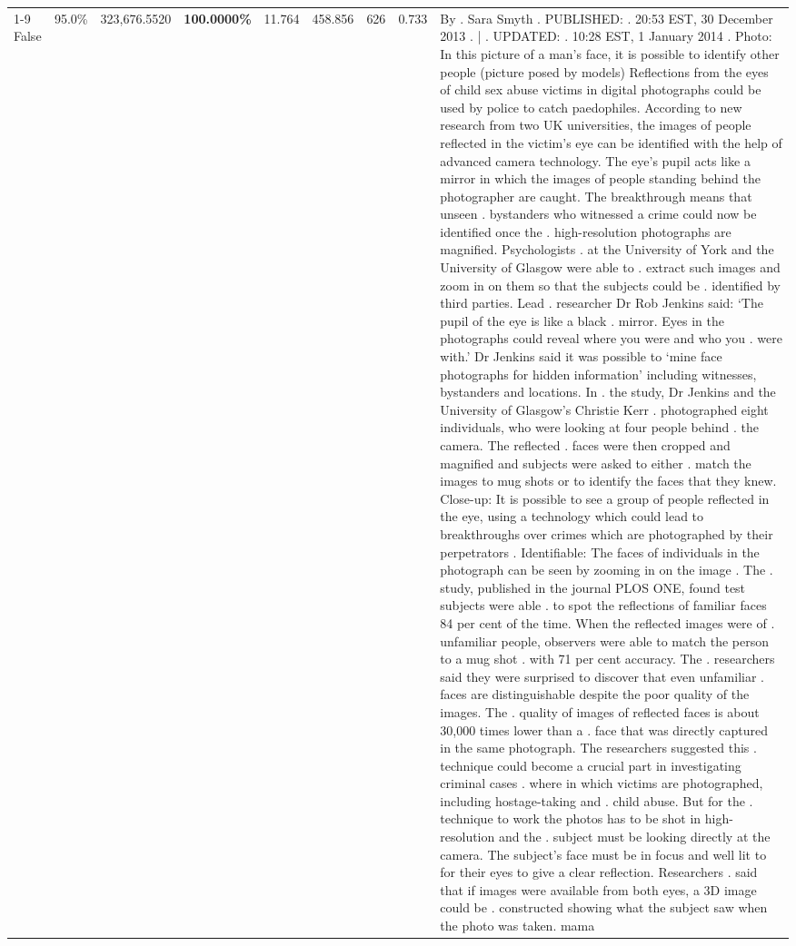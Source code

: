 \begin{table}[H]
\begin{tabular}{lllrlllll}
\cline{1-9}
False & 95.0\% & 323,676.5520 & \bfseries \color{red} 100.0000\% & 11.764 & 458.856 & 626 & 0.733 & By . Sara Smyth . PUBLISHED: . 20:53 EST, 30 December 2013 . | . UPDATED: . 10:28 EST, 1 January 2014 . Photo: In this picture of a man's face, it is possible to identify other people (picture posed by models) Reflections from the eyes of child sex abuse victims in digital photographs could be used by police to catch paedophiles. According to new research from two UK universities, the images of people reflected in the victim's eye can be identified with the help of advanced camera technology. The eye's pupil acts like a mirror in which the images of people standing behind the photographer are caught. The breakthrough means that unseen . bystanders who witnessed a crime could now be identified once the . high-resolution photographs are magnified. Psychologists . at the University of York and the University of Glasgow were able to . extract such images and zoom in on them so that the subjects could be . identified by third parties. Lead . researcher Dr Rob Jenkins said: ‘The pupil of the eye is like a black . mirror. Eyes in the photographs could reveal where you were and who you . were with.' Dr Jenkins said it was possible to ‘mine face photographs for hidden information' including witnesses, bystanders and locations. In . the study, Dr Jenkins and the University of Glasgow's Christie Kerr . photographed eight individuals, who were looking at four people behind . the camera. The reflected . faces were then cropped and magnified and subjects were asked to either . match the images to mug shots or to identify the faces that they knew. Close-up: It is possible to see a group of people reflected in the eye, using a technology which could lead to breakthroughs over crimes which are photographed by their perpetrators . Identifiable: The faces of individuals in the photograph can be seen by zooming in on the image . The . study, published in the journal PLOS ONE, found test subjects were able . to spot the reflections of familiar faces 84 per cent of the time. When the reflected images were of . unfamiliar people, observers were able to match the person to a mug shot . with 71 per cent accuracy. The . researchers said they were surprised to discover that even unfamiliar . faces are distinguishable despite the poor quality of the images. The . quality of images of reflected faces is about 30,000 times lower than a . face that was directly captured in the same photograph. The researchers suggested this . technique could become a crucial part in investigating criminal cases . where in which victims are photographed, including hostage-taking and . child abuse. But for the . technique to work the photos has to be shot in high-resolution and the . subject must be looking directly at the camera. The subject's face must be in focus and well lit to for their eyes to give a clear reflection. Researchers . said that if images were available from both eyes, a 3D image could be . constructed showing what the subject saw when the photo was taken. mama \\

\end{tabular}
\end{table}
